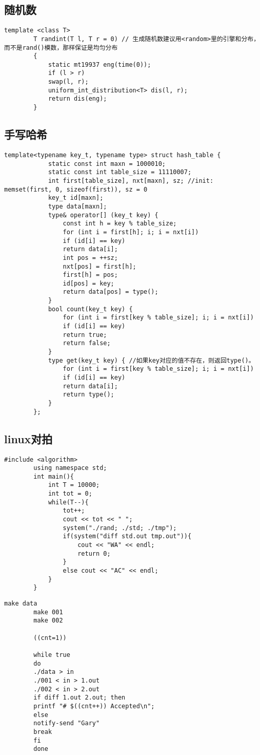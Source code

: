 \documentclass[12pt, a4paper]{ctexart}
\begin{document}
	\subsection{随机数}
	\begin{lstlisting}[caption={}]
		template <class T>
		T randint(T l, T r = 0) // 生成随机数建议用<random>里的引擎和分布，而不是rand()模数，那样保证是均匀分布
		{
			static mt19937 eng(time(0));
			if (l > r)
			swap(l, r);
			uniform_int_distribution<T> dis(l, r);
			return dis(eng);
		}
	\end{lstlisting}
	\subsection{手写哈希}
	\begin{lstlisting}[caption={}]
		template<typename key_t, typename type> struct hash_table {
			static const int maxn = 1000010;
			static const int table_size = 11110007;
			int first[table_size], nxt[maxn], sz; //init: memset(first, 0, sizeof(first)), sz = 0
			key_t id[maxn];
			type data[maxn];
			type& operator[] (key_t key) {
				const int h = key % table_size;
				for (int i = first[h]; i; i = nxt[i])
				if (id[i] == key)
				return data[i];
				int pos = ++sz;
				nxt[pos] = first[h];
				first[h] = pos;
				id[pos] = key;
				return data[pos] = type();
			}
			bool count(key_t key) {
				for (int i = first[key % table_size]; i; i = nxt[i])
				if (id[i] == key)
				return true;
				return false;
			}
			type get(key_t key) { //如果key对应的值不存在，则返回type()。
				for (int i = first[key % table_size]; i; i = nxt[i])
				if (id[i] == key)
				return data[i];
				return type();
			}
		};
	\end{lstlisting}
	\subsection{linux对拍}
	\begin{lstlisting}[caption={}]
		#include <algorithm>
		using namespace std;
		int main(){
			int T = 10000;
			int tot = 0;
			while(T--){
				tot++;
				cout << tot << " ";
				system("./rand; ./std; ./tmp");
				if(system("diff std.out tmp.out")){
					cout << "WA" << endl;
					return 0;
				}
				else cout << "AC" << endl;
			}
		}
	\end{lstlisting}
	\begin{lstlisting}[caption={}]
		make data
		make 001
		make 002
		
		((cnt=1))
		
		while true
		do
		./data > in
		./001 < in > 1.out
		./002 < in > 2.out
		if diff 1.out 2.out; then
		printf "# $((cnt++)) Accepted\n";
		else 
		notify-send "Gary"
		break
		fi
		done
	\end{lstlisting}
\end{document}
